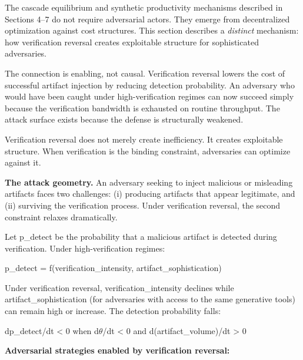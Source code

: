 \documentclass[11pt,a4paper]{article}
\begin{document}
The cascade equilibrium and synthetic productivity mechanisms described in Sections 4--7 do not require adversarial actors. They emerge from decentralized optimization against cost structures. This section describes a \emph{distinct} mechanism: how verification reversal creates exploitable structure for sophisticated adversaries.

The connection is enabling, not causal. Verification reversal lowers the cost of successful artifact injection by reducing detection probability. An adversary who would have been caught under high-verification regimes can now succeed simply because the verification bandwidth is exhausted on routine throughput. The attack surface exists because the defense is structurally weakened.

Verification reversal does not merely create inefficiency. It creates exploitable structure. When verification is the binding constraint, adversaries can optimize against it.

\textbf{The attack geometry.} An adversary seeking to inject malicious or misleading artifacts faces two challenges: (i) producing artifacts that appear legitimate, and (ii) surviving the verification process. Under verification reversal, the second constraint relaxes dramatically.

Let p\_detect be the probability that a malicious artifact is detected during verification. Under high-verification regimes:

p\_detect = f(verification\_intensity, artifact\_sophistication)

Under verification reversal, verification\_intensity declines while artifact\_sophistication (for adversaries with access to the same generative tools) can remain high or increase. The detection probability falls:

dp\_detect/dt < 0 when d$\theta$/dt < 0 and d(artifact\_volume)/dt > 0

\textbf{Adversarial strategies enabled by verification reversal:}
\end{document}
